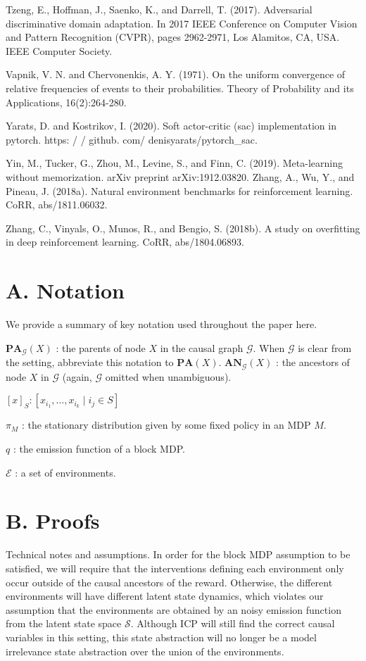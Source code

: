 \documentclass[10pt]{article}
\begin{document}
Tzeng, E., Hoffman, J., Saenko, K., and Darrell, T. (2017). Adversarial discriminative domain adaptation. In 2017 IEEE Conference on Computer Vision and Pattern Recognition (CVPR), pages 2962-2971, Los Alamitos, CA, USA. IEEE Computer Society.

Vapnik, V. N. and Chervonenkis, A. Y. (1971). On the uniform convergence of relative frequencies of events to their probabilities. Theory of Probability and its Applications, 16(2):264-280.

Yarats, D. and Kostrikov, I. (2020). Soft actor-critic (sac) implementation in pytorch. https: / / github. com/ denisyarats/pytorch\_sac.

Yin, M., Tucker, G., Zhou, M., Levine, S., and Finn, C. (2019). Meta-learning without memorization. arXiv preprint arXiv:1912.03820. Zhang, A., Wu, Y., and Pineau, J. (2018a). Natural environment benchmarks for reinforcement learning. CoRR, abs/1811.06032.

Zhang, C., Vinyals, O., Munos, R., and Bengio, S. (2018b). A study on overfitting in deep reinforcement learning. CoRR, abs/1804.06893.

\section{A. Notation}
We provide a summary of key notation used throughout the paper here.

$\mathbf{P A}_{\mathcal{G}}(X)$ : the parents of node $X$ in the causal graph $\mathcal{G}$. When $\mathcal{G}$ is clear from the setting, abbreviate this notation to $\mathbf{P A}(X)$. $\mathbf{A N}_{\mathcal{G}}(X)$ : the ancestors of node $X$ in $\mathcal{G}$ (again, $\mathcal{G}$ omitted when unambiguous).

$[x]_{S}:\left[x_{i_{1}}, \ldots, x_{i_{k}} \mid i_{j} \in S\right]$

$\pi_{M}$ : the stationary distribution given by some fixed policy in an MDP $M$.

$q$ : the emission function of a block MDP.

$\mathcal{E}$ : a set of environments.

\section{B. Proofs}
Technical notes and assumptions. In order for the block MDP assumption to be satisfied, we will require that the interventions defining each environment only occur outside of the causal ancestors of the reward. Otherwise, the different environments will have different latent state dynamics, which violates our assumption that the environments are obtained by an noisy emission function from the latent state space $\mathcal{S}$. Although ICP will still find the correct causal variables in this setting, this state abstraction will no longer be a model irrelevance state abstraction over the union of the environments.
\end{document}
